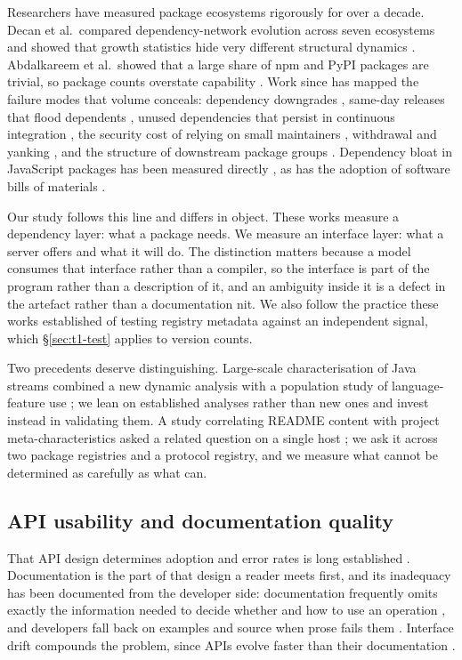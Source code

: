 \documentclass[a4paper,fleqn]{cas-dc}
\begin{document}
Researchers have measured package ecosystems rigorously for over a decade. Decan et
al.\ compared dependency-network evolution across seven ecosystems and showed
that growth statistics hide very different structural dynamics
\citep{decan2019}. Abdalkareem et al.\ showed that a large share of npm and
PyPI packages are trivial, so package counts overstate capability
\citep{abdalkareem2020}. Work since has mapped the failure modes that volume
conceals: dependency downgrades \citep{cogo2021downgrades}, same-day releases
that flood dependents \citep{cogo2021sameday}, unused dependencies that persist
in continuous integration \citep{weeraddana2024}, the security cost of relying
on small maintainers \citep{samaana2025}, withdrawal and yanking
\citep{li2023yanked}, and the structure of downstream package groups
\citep{qi2024}. Dependency bloat in JavaScript packages has been measured
directly \citep{bloat2025}, as has the adoption of software bills of materials
\citep{sbom2025}.

Our study follows this line and differs in object. These works measure a
dependency layer: what a package needs. We measure an interface layer: what a
server offers and what it will do. The distinction matters because a model
consumes that interface rather than a compiler, so the interface is part of the
program rather than a description of it, and an ambiguity inside it is a defect
in the artefact rather than a documentation nit. We also follow the practice these works
established of testing registry metadata against an independent signal, which
\S\ref{sec:t1-test} applies to version counts.

Two precedents deserve distinguishing. Large-scale characterisation of Java
streams combined a new dynamic analysis with a population study of
language-feature use \citep{javastreams2023}; we lean on established analyses
rather than new ones and invest instead in validating them. A study correlating
README content with project meta-characteristics asked a related question on a
single host \citep{readme2024}; we ask it across two package registries and a
protocol registry, and we measure what cannot be determined as carefully as
what can.

\subsection{API usability and documentation quality}

That API design determines adoption and error rates is long established
\citep{myers2016, robillard2009}. Documentation is the part of that design a
reader meets first, and its inadequacy has been documented from the developer
side: documentation frequently omits exactly the information needed to decide
whether and how to use an operation \citep{fan2020apidoc}, and developers fall
back on examples and source when prose fails them \citep{meng2019apidoc}.
Interface drift compounds the problem, since APIs evolve faster than their
documentation \citep{hora2016apievolution}.
\end{document}
